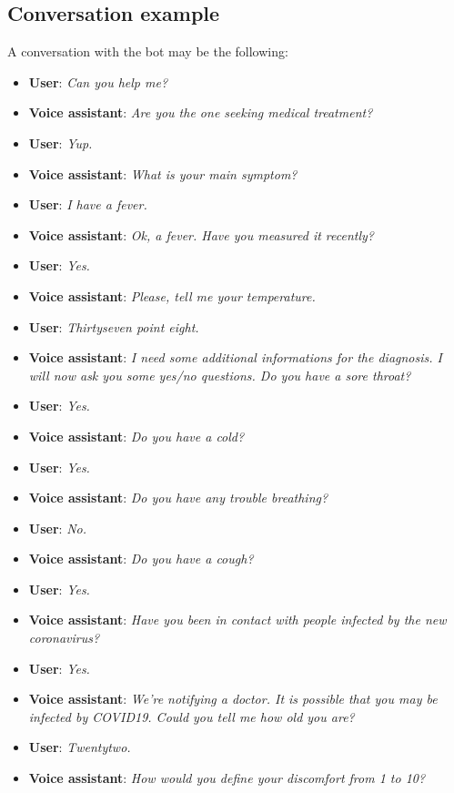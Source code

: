 \documentclass[conference]{IEEEtran}
\begin{document}
\subsection{Conversation example}
A conversation with the bot may be the following:
\begin{itemize}
    \item \textbf{User}: \textit{Can you help me?}
    \item \textbf{Voice assistant}: \textit{Are you the one seeking medical treatment?}
    \item \textbf{User}: \textit{Yup.}
    \item \textbf{Voice assistant}: \textit{What is your main symptom?}
    \item \textbf{User}: \textit{I have a fever.}
    \item \textbf{Voice assistant}: \textit{Ok, a fever. Have you measured it recently?}
    \item \textbf{User}: \textit{Yes.}
    \item \textbf{Voice assistant}: \textit{Please, tell me your temperature.}
    \item \textbf{User}: \textit{Thirtyseven point eight.}
    \item \textbf{Voice assistant}: \textit{I need some additional informations for the diagnosis. I will now ask you some yes/no questions. Do you have a sore throat?}
    \item \textbf{User}: \textit{Yes.}
    \item \textbf{Voice assistant}: \textit{Do you have a cold?}
    \item \textbf{User}: \textit{Yes.}
    \item \textbf{Voice assistant}: \textit{Do you have any trouble breathing?}
    \item \textbf{User}: \textit{No.}
    \item \textbf{Voice assistant}: \textit{Do you have a cough?}
    \item \textbf{User}: \textit{Yes.}
    \item \textbf{Voice assistant}: \textit{Have you been in contact with people infected by the new coronavirus?}
    \item \textbf{User}: \textit{Yes.}
    \item \textbf{Voice assistant}: \textit{We're notifying a doctor. It is possible that you may be infected by COVID19. Could you tell me how old you are?}
    \item \textbf{User}: \textit{Twentytwo.}
    \item \textbf{Voice assistant}: \textit{How would you define your discomfort from 1 to 10?}

\end{itemize}
\end{document}
